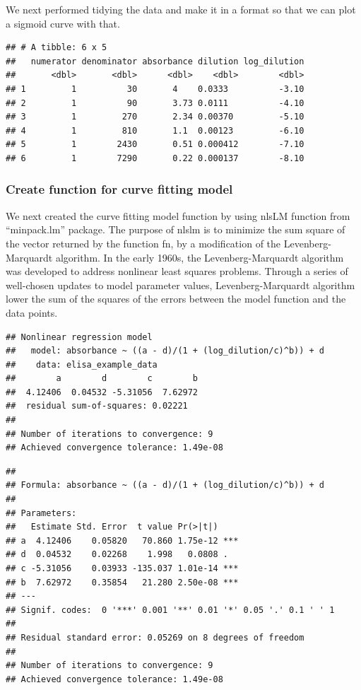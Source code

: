 \documentclass[
]{book}
\begin{document}
We next performed tidying the data and make it in a format so that we can plot a sigmoid curve with that.

\begin{verbatim}
## # A tibble: 6 x 5
##   numerator denominator absorbance dilution log_dilution
##       <dbl>       <dbl>      <dbl>    <dbl>        <dbl>
## 1         1          30       4    0.0333          -3.10
## 2         1          90       3.73 0.0111          -4.10
## 3         1         270       2.34 0.00370         -5.10
## 4         1         810       1.1  0.00123         -6.10
## 5         1        2430       0.51 0.000412        -7.10
## 6         1        7290       0.22 0.000137        -8.10
\end{verbatim}

\hypertarget{create-function-for-curve-fitting-model}{%
\subsubsection{Create function for curve fitting model}\label{create-function-for-curve-fitting-model}}

We next created the curve fitting model function by using nlsLM function from ``minpack.lm'' package.
The purpose of nlslm is to minimize the sum square of the vector returned by the function fn, by a modification of the Levenberg-Marquardt algorithm. In the early 1960s, the Levenberg-Marquardt algorithm was developed to address nonlinear least squares problems. Through a series of well-chosen updates to model parameter values, Levenberg-Marquardt algorithm lower the sum of the squares of the errors between the model function and the data points.

\begin{verbatim}
## Nonlinear regression model
##   model: absorbance ~ ((a - d)/(1 + (log_dilution/c)^b)) + d
##    data: elisa_example_data
##        a        d        c        b 
##  4.12406  0.04532 -5.31056  7.62972 
##  residual sum-of-squares: 0.02221
## 
## Number of iterations to convergence: 9 
## Achieved convergence tolerance: 1.49e-08
\end{verbatim}

\begin{verbatim}
## 
## Formula: absorbance ~ ((a - d)/(1 + (log_dilution/c)^b)) + d
## 
## Parameters:
##   Estimate Std. Error  t value Pr(>|t|)    
## a  4.12406    0.05820   70.860 1.75e-12 ***
## d  0.04532    0.02268    1.998   0.0808 .  
## c -5.31056    0.03933 -135.037 1.01e-14 ***
## b  7.62972    0.35854   21.280 2.50e-08 ***
## ---
## Signif. codes:  0 '***' 0.001 '**' 0.01 '*' 0.05 '.' 0.1 ' ' 1
## 
## Residual standard error: 0.05269 on 8 degrees of freedom
## 
## Number of iterations to convergence: 9 
## Achieved convergence tolerance: 1.49e-08
\end{verbatim}
\end{document}
